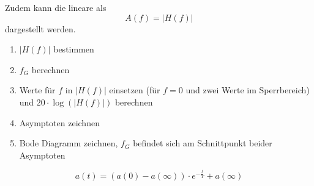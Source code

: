\documentclass[12pt, a4paper, twoside]{scrartcl}
\begin{document}
Zudem kann die lineare  als
\[A(f) = |H(f)|\]
dargestellt werden.


\begin{enumerate}
\item \(|H(f)|\) bestimmen
\item \(f_G\) berechnen
\item Werte für \(f\) in \(|H(f)|\) einsetzen (für \(f=0\) und zwei Werte im Sperrbereich) und \(20\cdot\log(|H(f)|)\) berechnen
\item Asymptoten zeichnen
\item Bode Diagramm zeichnen, \(f_G\) befindet sich am Schnittpunkt beider Asymptoten
\end{enumerate}

\[a(t) = (a(0) - a(\infty)) \cdot e^{-\frac{t}{T}} + a(\infty)\]

\newpage
{}%
\addtocounter{section}{1}

\newpage
{}%
\addtocounter{subsection}{1}


\newpage
{}%
\addtocounter{subsection}{1}

\end{document}
